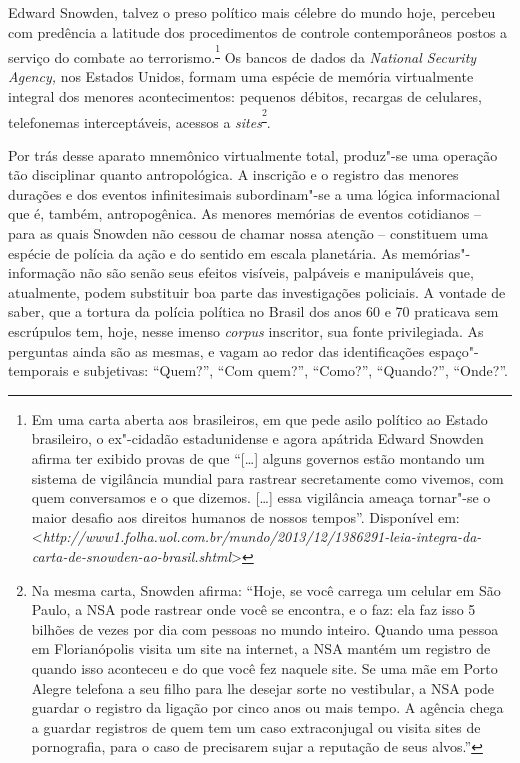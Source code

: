 Edward Snowden, talvez o preso político mais célebre do mundo hoje,
percebeu com predência a latitude dos procedimentos de controle
contemporâneos postos a serviço do combate ao
terrorismo.\textsuperscript{\footnote{Em uma carta aberta aos
  brasileiros, em que pede asilo político ao Estado brasileiro, o
  ex"-cidadão estadunidense e agora apátrida Edward Snowden afirma ter
  exibido provas de que ``{[}\ldots{}{]} alguns governos estão montando
  um sistema de vigilância mundial para rastrear secretamente como
  vivemos, com quem conversamos e o que dizemos. {[}\ldots{}{]} essa
  vigilância ameaça tornar"-se o maior desafio aos direitos humanos de
  nossos tempos''. Disponível em:
  \textless{}{\emph{http://www1.folha.uol.com.br/mundo/2013/12/1386291-leia-integra-da-carta-de-snowden-ao-brasil.shtml}}\textgreater{}}}
Os bancos de dados da \emph{National Security Agency, }nos Estados
Unidos, formam uma espécie de memória virtualmente integral dos menores
acontecimentos: pequenos débitos, recargas de celulares, telefonemas
interceptáveis, acessos a \emph{sites}\textsuperscript{\footnote{Na
  mesma carta, Snowden afirma: ``Hoje, se você carrega um celular em São
  Paulo, a NSA pode rastrear onde você se encontra, e o faz: ela faz
  isso 5 bilhões de vezes por dia com pessoas no mundo inteiro. Quando
  uma pessoa em Florianópolis visita um site na internet, a NSA mantém
  um registro de quando isso aconteceu e do que você fez naquele site.
  Se uma mãe em Porto Alegre telefona a seu filho para lhe desejar sorte
  no vestibular, a NSA pode guardar o registro da ligação por cinco anos
  ou mais tempo. A agência chega a guardar registros de quem tem um caso
  extraconjugal ou visita sites de pornografia, para o caso de
  precisarem sujar a reputação de seus alvos.''}}.

Por trás desse aparato mnemônico virtualmente total, produz"-se uma
operação tão disciplinar quanto antropológica. A inscrição e o registro
das menores durações e dos eventos infinitesimais subordinam"-se a uma
lógica informacional que é, também, antropogênica. As menores memórias
de eventos cotidianos -- para as quais Snowden não cessou de chamar
nossa atenção -- constituem uma espécie de polícia da ação e do sentido
em escala planetária. As memórias"-informação não são senão seus efeitos
visíveis, palpáveis e manipuláveis que, atualmente, podem substituir boa
parte das investigações policiais. A vontade de saber, que a tortura da
polícia política no Brasil dos anos 60 e 70 praticava sem escrúpulos
tem, hoje, nesse imenso \emph{corpus }inscritor, sua fonte privilegiada.
As perguntas ainda são as mesmas, e vagam ao redor das identificações
espaço"-temporais e subjetivas: ``Quem?'', ``Com quem?'', ``Como?'',
``Quando?'', ``Onde?''.

